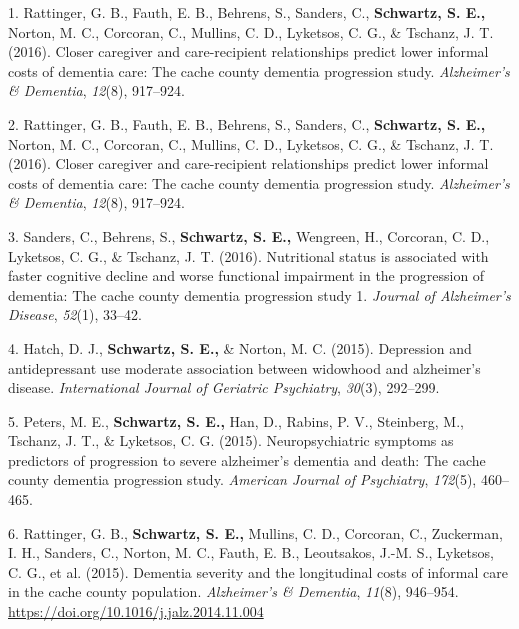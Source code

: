 \documentclass[11pt,a4paper,]{moderncv}
\newlength{\cslhangindent}
\newenvironment{CSLReferences}[2] %
 {\begin{list}{}{%
  \setlength{\itemindent}{0pt}
  \setlength{\leftmargin}{0pt}
  \setlength{\parsep}{0pt}
  \ifodd #1
   \setlength{\leftmargin}{\cslhangindent}
   \setlength{\itemindent}{-1\cslhangindent}
  \fi
  \setlength{\itemsep}{#2\baselineskip}}}
 {\end{list}}
\begin{document}
\label{refs-ea6365bba6475e39572be695976f1cdf}
\begin{CSLReferences}{1}{0}
1. Rattinger, G. B., Fauth, E. B., Behrens, S., Sanders, C.,
\textbf{Schwartz, S. E.,} Norton, M. C., Corcoran, C., Mullins, C. D.,
Lyketsos, C. G., \& Tschanz, J. T. (2016). Closer caregiver and
care-recipient relationships predict lower informal costs of dementia
care: The cache county dementia progression study. \emph{Alzheimer's \&
Dementia}, \emph{12}(8), 917--924.

2. Rattinger, G. B., Fauth, E. B., Behrens, S., Sanders, C.,
\textbf{Schwartz, S. E.,} Norton, M. C., Corcoran, C., Mullins, C. D.,
Lyketsos, C. G., \& Tschanz, J. T. (2016). Closer caregiver and
care-recipient relationships predict lower informal costs of dementia
care: The cache county dementia progression study. \emph{Alzheimer's \&
Dementia}, \emph{12}(8), 917--924.

3. Sanders, C., Behrens, S., \textbf{Schwartz, S. E.,} Wengreen, H.,
Corcoran, C. D., Lyketsos, C. G., \& Tschanz, J. T. (2016). Nutritional
status is associated with faster cognitive decline and worse functional
impairment in the progression of dementia: The cache county dementia
progression study 1. \emph{Journal of Alzheimer's Disease},
\emph{52}(1), 33--42.

4. Hatch, D. J., \textbf{Schwartz, S. E.,} \& Norton, M. C. (2015).
Depression and antidepressant use moderate association between widowhood
and alzheimer's disease. \emph{International Journal of Geriatric
Psychiatry}, \emph{30}(3), 292--299.

5. Peters, M. E., \textbf{Schwartz, S. E.,} Han, D., Rabins, P. V.,
Steinberg, M., Tschanz, J. T., \& Lyketsos, C. G. (2015).
Neuropsychiatric symptoms as predictors of progression to severe
alzheimer's dementia and death: The cache county dementia progression
study. \emph{American Journal of Psychiatry}, \emph{172}(5), 460--465.

6. Rattinger, G. B., \textbf{Schwartz, S. E.,} Mullins, C. D., Corcoran,
C., Zuckerman, I. H., Sanders, C., Norton, M. C., Fauth, E. B.,
Leoutsakos, J.-M. S., Lyketsos, C. G., et al. (2015). Dementia severity
and the longitudinal costs of informal care in the cache county
population. \emph{Alzheimer's \& Dementia}, \emph{11}(8), 946--954.
\url{https://doi.org/10.1016/j.jalz.2014.11.004}


\end{CSLReferences}
\end{document}
